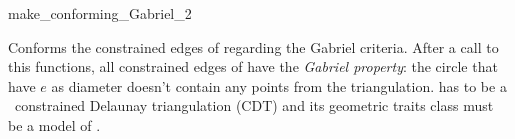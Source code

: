 \begin{ccRefFunction}{make_conforming_Gabriel_2}


{ Conforms the constrained edges of  regarding the Gabriel
  criteria. After a call to this functions, all constrained edges of
   have the \emph{Gabriel property}: the circle that have $e$
  as diameter doesn't contain any points from the triangulation.
  \ccPrecond {} has to be a \cgal\ constrained Delaunay
  triangulation (CDT) and its geometric traits class must be a model
  of .}

\end{ccRefFunction}

